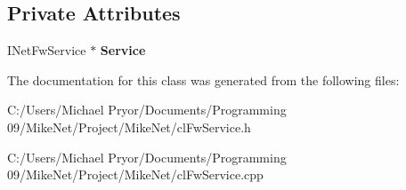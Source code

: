 \subsection*{Private Attributes}
\begin{DoxyCompactItemize}
\item 
\hypertarget{classcl_fw_service_adbb653377d573fb2c83dbaa1dee48bc4}{
INetFwService $\ast$ {\bfseries Service}}
\label{classcl_fw_service_adbb653377d573fb2c83dbaa1dee48bc4}

\end{DoxyCompactItemize}


The documentation for this class was generated from the following files:\begin{DoxyCompactItemize}
\item 
C:/Users/Michael Pryor/Documents/Programming 09/MikeNet/Project/MikeNet/clFwService.h\item 
C:/Users/Michael Pryor/Documents/Programming 09/MikeNet/Project/MikeNet/clFwService.cpp\end{DoxyCompactItemize}
